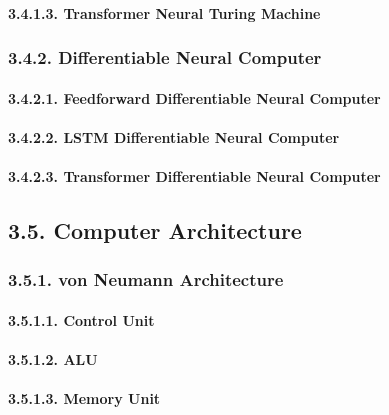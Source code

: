\documentclass[]{article}
\let\oldparagraph\paragraph
\renewcommand{\paragraph}[1]{\oldparagraph{#1}\mbox{}}
\begin{document}
\paragraph{3.4.1.3. Transformer Neural Turing
Machine}\label{transformer-neural-turing-machine}

\subsubsection{3.4.2. Differentiable Neural
Computer}\label{differentiable-neural-computer}

\paragraph{3.4.2.1. Feedforward Differentiable Neural
Computer}\label{feedforward-differentiable-neural-computer}

\paragraph{3.4.2.2. LSTM Differentiable Neural
Computer}\label{lstm-differentiable-neural-computer}

\paragraph{3.4.2.3. Transformer Differentiable Neural
Computer}\label{transformer-differentiable-neural-computer}

\subsection{3.5. Computer Architecture}\label{computer-architecture}

\subsubsection{3.5.1. von Neumann
Architecture}\label{von-neumann-architecture}

\paragraph{3.5.1.1. Control Unit}\label{control-unit}

\paragraph{3.5.1.2. ALU}\label{alu}

\paragraph{3.5.1.3. Memory Unit}\label{memory-unit}
\end{document}
